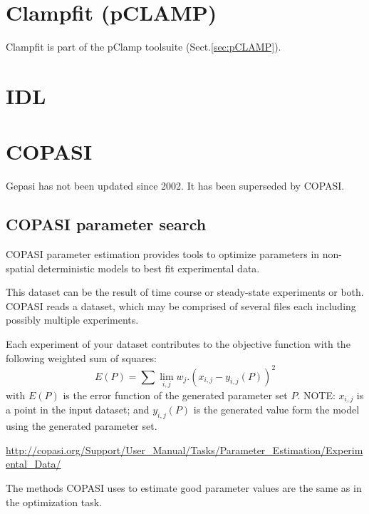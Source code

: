 \section{Clampfit (pCLAMP)}
\label{sec:Clampfit}

Clampfit is part of the pClamp toolsuite (Sect.\ref{sec:pCLAMP}).




\section{IDL}

\section{COPASI}
\label{sec:COPASI}
\label{sec:Gepasi}

Gepasi has not been updated since 2002. It has been superseded by COPASI.

\subsection{COPASI parameter search}
\label{sec:COPASI-paramsearch}

COPASI parameter estimation provides tools to optimize parameters in non-spatial
deterministic models to best fit experimental data.

This dataset can be the result of time course or steady-state experiments or
both. COPASI reads a dataset, which may be comprised of several files each
including possibly multiple experiments.

Each experiment of your dataset contributes to the objective function with the
following weighted sum of squares:
\begin{equation}
E(P) = \sum\lim_{i,j} w_j . \left( x_{i,j} - y_{i,j} (P) \right)^2
\end{equation}
with $E(P)$ is the error function of the generated parameter set $P$.
NOTE: $x_{i,j}$ is a point in the input dataset; and $y_{i,j}(P)$ is the
generated value form the model using the generated parameter set.

\url{http://copasi.org/Support/User_Manual/Tasks/Parameter_Estimation/Experimental_Data/}

The methods COPASI uses to estimate good parameter values are the same as in the
optimization task.




